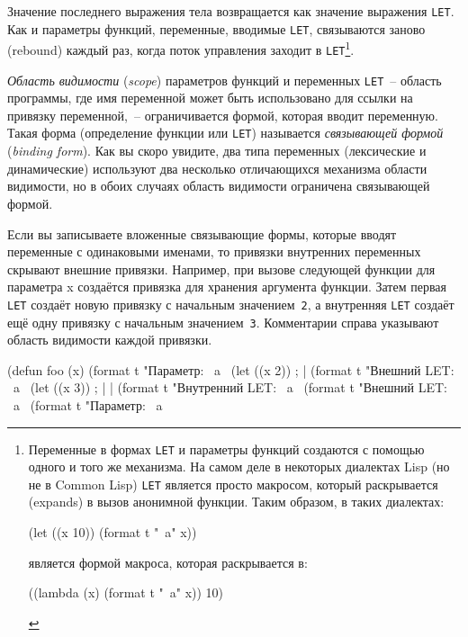 Значение последнего выражения тела возвращается как значение выражения \lstinline{LET}. Как и
параметры функций, переменные, вводимые \lstinline{LET}, связываются заново (rebound) каждый
раз, когда поток управления заходит в \lstinline{LET}\footnote{Переменные в формах \lstinline{LET} и
параметры функций создаются с помощью одного и того же механизма. На самом деле в
некоторых диалектах Lisp (но не в Common Lisp) \lstinline{LET} является просто макросом,
который раскрывается (expands) в вызов анонимной функции. Таким образом, в таких диалектах:

\begin{myverb}
(let ((x 10)) (format t "~a" x))
\end{myverb}


\noindent{}является формой макроса, которая раскрывается в:

\begin{myverb}
((lambda (x) (format t "~a" x)) 10)
\end{myverb}
}\hspace{\footnotenegspace}.

\textit{Область видимости} (\textit{scope}) параметров функций и переменных
\lstinline{LET}~-- область программы, где имя переменной может быть использовано для ссылки
на привязку переменной,~-- ограничивается формой, которая вводит переменную. Такая форма
(определение функции или \lstinline{LET}) называется \textit{связывающей формой}
(\textit{binding form}). Как вы скоро увидите, два типа переменных (лексические и
динамические) используют два несколько отличающихся механизма области видимости, но в
обоих случаях область видимости ограничена связывающей формой.

Если вы записываете вложенные связывающие формы, которые вводят переменные с одинаковыми
именами, то привязки внутренних переменных скрывают внешние привязки. Например, при вызове
следующей функции для параметра x создаётся привязка для хранения аргумента функции. Затем
первая \lstinline{LET} создаёт новую привязку с начальным значением~\lstinline{2}, а внутренняя
\lstinline{LET} создаёт ещё одну привязку с начальным значением~\lstinline{3}. Комментарии справа
указывают область видимости каждой привязки.

\begin{myverb}
(defun foo (x)
  (format t "Параметр: ~a~%
  (let ((x 2))                             ; |
    (format t "Внешний LET: ~a~%
    (let ((x 3))                           ; | |
      (format t "Внутренний LET: ~a~%
    (format t "Внешний LET: ~a~%
  (format t "Параметр: ~a~%
\end{myverb}

